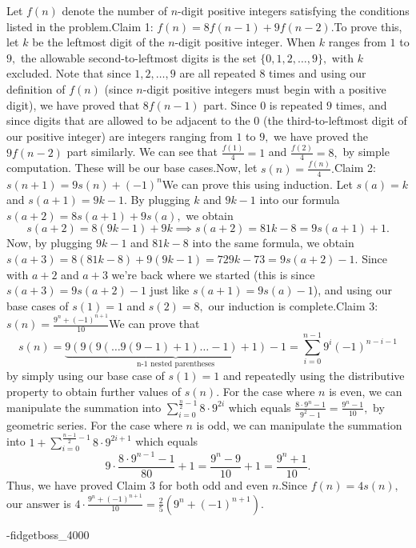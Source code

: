 \begin{enumerate}
Let $f(n)$ denote the number of $n$-digit positive integers satisfying the conditions listed in the problem.Claim 1: $f(n) = 8f(n-1) + 9f(n-2).$To prove this, let $k$ be the leftmost digit of the $n$-digit positive integer. When $k$ ranges from $1$ to $9,$ the allowable second-to-leftmost digits is the set $\{0, 1, 2, \ldots, 9\},$ with $k$ excluded. Note that since $1, 2, \ldots, 9$ are all repeated $8$ times and using our definition of $f(n)$ (since $n$-digit positive integers must begin with a positive digit), we have proved that $8f(n-1)$ part. Since $0$ is repeated $9$ times, and since digits that are allowed to be adjacent to the $0$ (the third-to-leftmost digit of our positive integer) are integers ranging from $1$ to $9,$ we have proved the $9f(n-2)$ part similarly. We can see that $\frac{f(1)}{4} = 1$ and $\frac{f(2)}{4} = 8,$ by simple computation. These will be our base cases.Now, let $s(n) = \frac{f(n)}{4}.$Claim 2: $s(n+1) = 9s(n) + (-1)^n$We can prove this using induction. Let $s(a) = k$ and $s(a+1) = 9k - 1.$ By plugging $k$ and $9k - 1$ into our formula $s(a+2) = 8s(a+1) + 9s(a),$ we obtain 
 \[s(a+2) = 8(9k-1) + 9k \implies s(a+2) = 81k - 8 = 9s(a+1) + 1.\]Now, by plugging $9k - 1$ and $81k - 8$ into the same formula, we obtain $s(a+3) = 8(81k - 8) + 9(9k - 1) = 729k - 73 = 9s(a+2) - 1.$ Since with $a+2$ and $a+3$ we’re back where we started (this is since $s(a+3) = 9s(a+2) - 1$ just like $s(a+1) = 9s(a) - 1$), and using our base cases of $s(1) = 1$ and $s(2) = 8,$ our induction is complete.Claim 3: $s(n) = \frac{9^n + (-1)^{n+1}}{10}$We can prove that 
 \[s(n) = \underbrace{9(9(9(\ldots9(9-1)+1)\ldots-1)+1)-1}_{\text{n-1 nested parentheses}} = \sum_{i=0}^{n-1} 9^{i} (-1)^{n-i-1}\]by simply using our base case of $s(1) = 1$ and repeatedly using the distributive property to obtain further values of $s(n).$ For the case where $n$ is even, we can manipulate the summation into $\sum_{i=0}^{\frac{n}{2} - 1} 8 \cdot 9^{2i}$ which equals $\frac{8 \cdot 9^{n} - 1}{9^2 - 1} = \frac{9^n - 1}{10},$ by geometric series. For the case where $n$ is odd, we can manipulate the summation into $1 + \sum_{i=0}^{\frac{n-1}{2} - 1} 8 \cdot 9^{2i + 1}$ which equals 
 \[9 \cdot \frac{8 \cdot 9^{n-1} - 1}{80} + 1 = \frac{9^n - 9}{10} + 1 = \frac{9^n + 1}{10}.\]Thus, we have proved Claim 3 for both odd and even $n.$Since $f(n) = 4s(n),$ our answer is $4 \cdot \frac{9^n + (-1)^{n+1}}{10} = \boxed{ \frac{2}{5} (9^n + (-1)^{n+1})}.$

 -fidgetboss\_4000

 



\end{enumerate}
